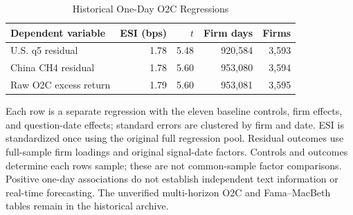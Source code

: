 \begin{table}[H]
\centering\footnotesize
\caption{Historical One-Day O2C Regressions}\label{tab:panel_horse_race}
\begin{threeparttable}
\renewcommand{\arraystretch}{1.12}
\begin{tabular*}{\textwidth}{@{\extracolsep{\fill}}lrrrr@{}}
\toprule
Dependent variable & ESI (bps) & $t$ & Firm days & Firms \\
\midrule
U.S. q5 residual & 1.78 & 5.48 & 920,584 & 3,593 \\
China CH4 residual & 1.78 & 5.60 & 953,080 & 3,594 \\
Raw O2C excess return & 1.79 & 5.60 & 953,081 & 3,595 \\
\bottomrule
\end{tabular*}
\begin{tablenoteblock}
Each row is a separate regression with the eleven baseline controls, firm effects, and question-date effects; standard errors are clustered by firm and date. ESI is standardized once using the original full regression pool. Residual outcomes use full-sample firm loadings and original signal-date factors. Controls and outcomes determine each row\textquotesingle s sample; these are not common-sample factor comparisons. Positive one-day associations do not establish independent text information or real-time forecasting. The unverified multi-horizon O2C and Fama--MacBeth tables remain in the historical archive.
\end{tablenoteblock}
\end{threeparttable}
\end{table}
